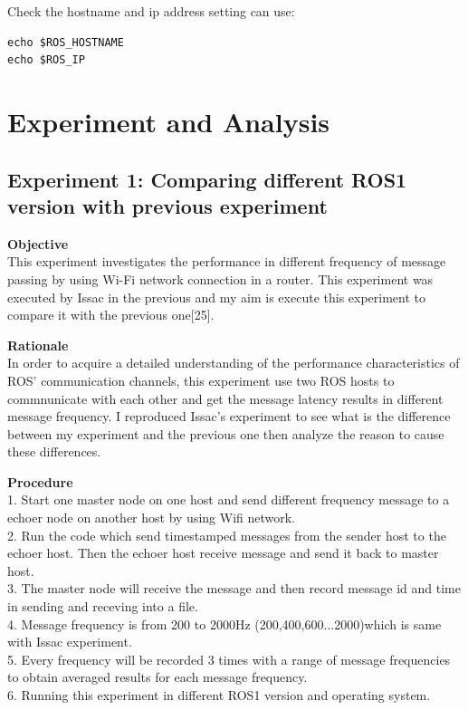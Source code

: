 \documentclass{mproj}
\begin{document}
Check the hostname and ip address setting can use:
\begin{verbatim}
echo $ROS_HOSTNAME
echo $ROS_IP
\end{verbatim}

\chapter{Experiment and Analysis}

\section{Experiment 1: Comparing different ROS1 version  with previous experiment}
\textbf{Objective} \\
This experiment investigates the performance in different frequency of message passing by using Wi-Fi network connection in a router.  This experiment was executed by Issac in the previous and my aim is execute this experiment to compare it with the previous one[25].

\textbf{Rationale} \\
In order to acquire a detailed understanding of the performance characteristics of ROS’ communication channels, this experiment use two ROS hosts to commnunicate with each other and get the message latency results in different message frequency. I reproduced Issac's experiment to see what is the difference between my experiment and the previous one then analyze the reason to cause these differences.

\textbf{Procedure} \\
1. Start one master node on one host and send different frequency message to a echoer node on another host by using Wifi network. \\
2. Run the code which send timestamped messages from the sender host to the echoer host. Then the echoer host receive message and send it back to master host. \\
3. The master node will receive the message and then record message id and time in sending and receving into a file.  \\
4. Message frequency is from 200 to 2000Hz (200,400,600...2000)which is same with Issac experiment. \\
5. Every frequency will be recorded 3 times with a range of message frequencies to obtain averaged results for each message frequency. \\
6. Running this experiment in different ROS1 version and operating system.
\end{document}
